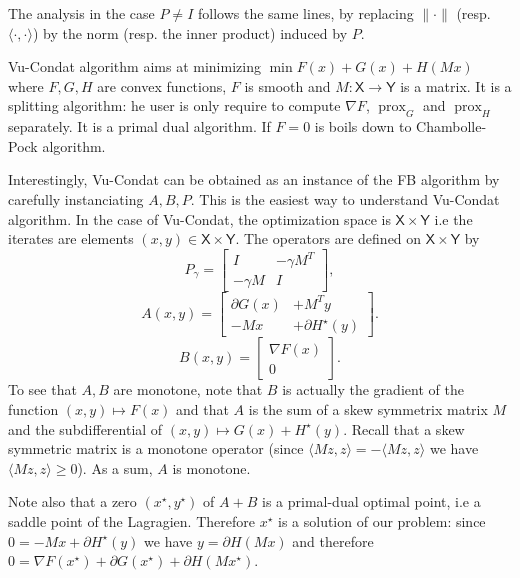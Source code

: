 \documentclass{article}
\DeclareMathOperator{\prox}{prox}
\newcommand{\sX}{{\mathsf X}}
\newcommand{\sY}{{\mathsf Y}}
\newcommand{\ps}[1]{\langle #1 \rangle}
\theoremstyle{definition}
\begin{document}
The analysis in the case $P \neq I$ follows the same lines, by replacing $\|\cdot\|$ (resp. $\ps{\cdot,\cdot}$) by the norm (resp. the inner product) induced by $P$. 





Vu-Condat algorithm aims at minimizing $\min F(x) + G(x) + H(Mx)$ where $F,G,H$ are convex functions, $F$ is smooth and $M : \sX \to \sY$ is a matrix. It is a splitting algorithm: he user is only require to compute $\nabla F$, $\prox_G$ and $\prox_H$ separately. It is a primal dual algorithm. If $F=0$ is boils down to Chambolle-Pock algorithm.

Interestingly, Vu-Condat can be obtained as an instance of the FB algorithm by carefully instanciating $A,B,P$. This is the easiest way to understand Vu-Condat algorithm. In the case of Vu-Condat, the optimization space is $\sX \times \sY$ i.e the iterates are elements $(x,y) \in \sX \times \sY$. The operators are defined on $\sX \times \sY$ by
\[
P_\gamma = \begin{bmatrix} I &  -\gamma M^T \\ -\gamma M & I \end{bmatrix},
\]
\[
A(x,y) = \begin{bmatrix} \partial G(x)&  + M^T y \\ -M x& +\partial H^\star(y)\end{bmatrix} .
\]
\[
B(x,y) = \begin{bmatrix} \nabla F(x) \\ 0 \end{bmatrix} .
\]
To see that $A,B$ are monotone, note that $B$ is actually the gradient of the function $(x,y) \mapsto F(x)$ and that $A$ is the sum of a skew symmetrix matrix $M$ and the subdifferential of $(x,y) \mapsto G(x) + H^\star(y)$. Recall that a skew symmetric matrix is a monotone operator (since $\ps{Mz,z} = -\ps{Mz,z}$ we have $\ps{Mz,z} \geq 0$). As a sum, $A$ is monotone.

Note also that a zero $(x^\star,y^\star)$ of $A+B$ is a primal-dual optimal point, i.e a saddle point of the Lagragien. Therefore $x^\star$ is a solution of our problem: since $0 = -Mx +\partial H^\star(y)$ we have $y = \partial H(Mx)$ and therefore $0=  \nabla F(x^\star) + \partial G(x^\star) + \partial H(M x^\star)$.
\end{document}
